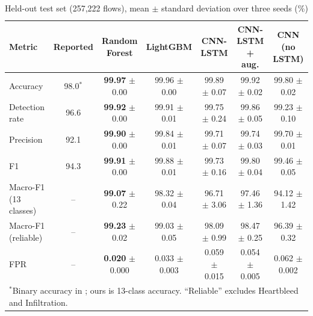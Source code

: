 \documentclass[conference]{IEEEtran}
\begin{document}
\begin{table}[t]
\caption{Held-out test set (257,222 flows), mean $\pm$ standard deviation over three seeds (\%)}
\label{tab:main}
\centering
\footnotesize
\begin{tabular}{lcccccc}
\toprule
Metric & Reported \cite{refpaper2025} & Random Forest & LightGBM & CNN-LSTM & CNN-LSTM + aug. & CNN (no LSTM) \\
\midrule
Accuracy & 98.0$^\ast$ & \textbf{99.97} $\pm$ 0.00 & 99.96 $\pm$ 0.00 & 99.89 $\pm$ 0.07 & 99.92 $\pm$ 0.02 & 99.80 $\pm$ 0.02 \\
Detection rate & 96.6 & \textbf{99.92} $\pm$ 0.00 & 99.91 $\pm$ 0.01 & 99.75 $\pm$ 0.24 & 99.86 $\pm$ 0.05 & 99.23 $\pm$ 0.10 \\
Precision & 92.1 & \textbf{99.90} $\pm$ 0.00 & 99.84 $\pm$ 0.01 & 99.71 $\pm$ 0.07 & 99.74 $\pm$ 0.03 & 99.70 $\pm$ 0.01 \\
F1 & 94.3 & \textbf{99.91} $\pm$ 0.00 & 99.88 $\pm$ 0.01 & 99.73 $\pm$ 0.16 & 99.80 $\pm$ 0.04 & 99.46 $\pm$ 0.05 \\
Macro-F1 (13 classes) & -- & \textbf{99.07} $\pm$ 0.22 & 98.32 $\pm$ 0.04 & 96.71 $\pm$ 3.06 & 97.46 $\pm$ 1.36 & 94.12 $\pm$ 1.42 \\
Macro-F1 (reliable) & -- & \textbf{99.23} $\pm$ 0.02 & 99.03 $\pm$ 0.05 & 98.09 $\pm$ 0.99 & 98.47 $\pm$ 0.25 & 96.39 $\pm$ 0.32 \\
FPR & -- & \textbf{0.020} $\pm$ 0.000 & 0.033 $\pm$ 0.003 & 0.059 $\pm$ 0.015 & 0.054 $\pm$ 0.005 & 0.062 $\pm$ 0.002 \\
\bottomrule
\multicolumn{7}{l}{$^\ast$Binary accuracy in \cite{refpaper2025}; ours is 13-class accuracy. ``Reliable'' excludes Heartbleed and Infiltration.}
\end{tabular}
\end{table}
\end{document}
